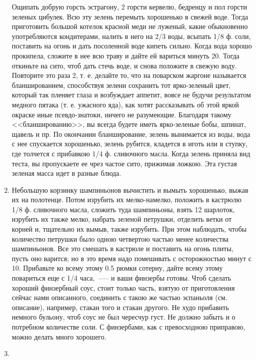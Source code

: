 \begin{enumerate}
Ощипать добрую горсть эстрагону, 2 горсти кервелю, бедренцу и пол горсти зеленых цибулек. Всю эту зелень перемыть хорошенько в свежей воде. Тогда приготовить большой котелок красной меди не луженый, какие обыкновенно употребляются кондитерами, налить в него на 2/3 воды, всыпать 1/8 ф. соли, поставить на огонь и дать посоленной воде кипеть сильно. Когда вода хорошо прокипела, сложите в нее всю траву и дайте ей вариться минуть 20. Тогда откиньте на сито, чтоб дать стечь воде, и снова положите в свежую воду. Повторите это раза 2, т. е. делайте то, что на поварском жаргоне называется бланшированием, способствуя зелени сохранить тот ярко-зеленый цвет, который так пленяет глаза и возбуждает аппетит, вовсе не будучи результатом медного пятака (т. е. ужасного яда), как хотят рассказывать об этой яркой окраске иные псевдо-знатоки, ничего не разумеющие. Благодаря такому <<бланшированию>>, вы всегда будете иметь ярко-зеленые бобы, шпинат, щавель и пр. По окончании бланширование, зелень вынимается из воды, вода с нее спускается хорошенько, зелень рубится, кладется в иготь или в ступку, где толчется с прибавкою 1/4 ф. сливочного масла. Когда зелень приняла вид теста, вы пропускаете ее чрез частое сито, прижимая ложкою. Эта густая зеленая масса идет в разные блюда.

	\item {}
    
Небольшую корзинку шампиньонов вычистить и вымыть хорошенько, выжав их на полотенце. Потом изрубить их мелко-намелко, положить в кастрюлю 1/8 ф. сливочного масла, сложить туда шампиньоны, взять 12 шарлоток, изрубить их также мелко, набрать зеленой петрушки, отделить ветки от корней и, тщательно их вымыв, также изрубить. При этом наблюдать, чтобы количество петрушки было одною четвертою частью менее количества шампиньонов. Все это смешать в кастрюле и поставить на огонь плиты, пусть оно варится; но в это время надо помешивать с осторожностью минут с 10. Прибавьте ко всему этому 0.5 рюмки сотерну, дайте всему этому повариться еще с 1/4 часа,~--— и ваши финзербы готовы. Чтоб сделать хороший финзербный соус, стоит только часть, взятую от приготовления сейчас нами описанного, соединить с такою же частью эспаньоля (см. описание), например, стакан того и стакан другого. Не худо прибавить немного бульону, чтоб соус не был чересчур густ. Не должно забыть и о потребном количестве соли. С финзербами, как с превосходною приправою, можно делать много хорошего.

	\item {}
    

\end{enumerate}
